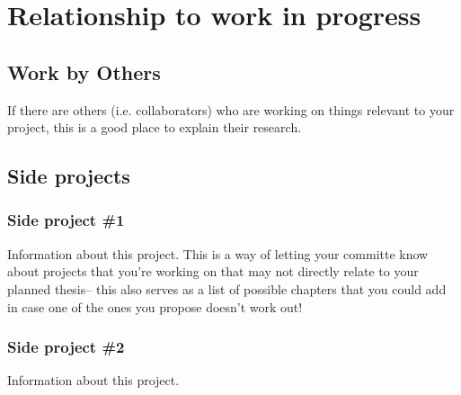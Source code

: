 \section{Relationship to work in progress}
\subsection{Work by Others}
If there are others (i.e. collaborators) who are working on things relevant to your project, this is a good place to explain their research.

\subsection{Side projects}
\subsubsection*{Side project \#1}
Information about this project. This is a way of letting your committe know about projects that you're working on that may not directly relate to your planned thesis-- this also serves as a list of possible chapters that you could add in case one of the ones you propose doesn't work out!

\subsubsection*{Side project \#2}
Information about this project.